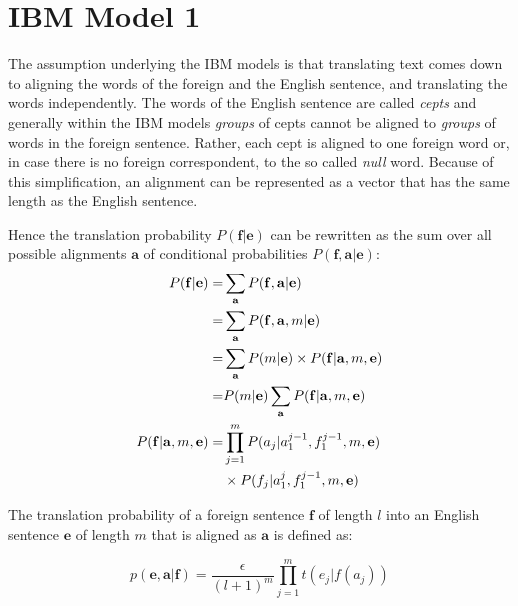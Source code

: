 \documentclass[11pt]{article}
\renewcommand{\vec}[1]{\mathbf{#1}}
\begin{document}
\section{IBM Model 1}
\label{IBM1}

The assumption underlying the IBM models is that translating text comes down to aligning the words 
of the foreign and the English sentence, and translating the words independently.
The words of the English sentence are called \textit{cepts} and generally within the IBM models \emph{groups} of cepts cannot be aligned to \emph{groups} of words in the foreign sentence.  Rather, each cept  is aligned to one foreign word or, in case there is no foreign correspondent, to the so called \textit{null} word.
Because of this simplification, an alignment can be represented as a vector that has the same length as the English sentence.

Hence the translation probability $P(\vec{f}|\vec{e})$ can be rewritten as the sum over all possible alignments $\vec{a}$ of conditional probabilities $P(\vec{f}, \vec{a}|\vec{e})$:
\begin{align}
P(\vec{f}|\vec{e}) =& \sum_\vec{a} P(\vec{f},\vec{a}|\vec{e})\\
=&\sum_\vec{a}  P(\vec{f},\vec{a},m|\vec{e}) \\
=&\sum_\vec{a}  P(m|\vec{e})\times P(\vec{f}|\vec{a},m,\vec{e})\\
=&  P(m|\vec{e}) \sum_\vec{a} P(\vec{f}|\vec{a},m,\vec{e})\\
P(\vec{f}|\vec{a},m,\vec{e})=&\prod_{j=1}^{m} P(a_j|a_1^{j-1}, f_1^{j-1}, m, \vec{e}) \notag \\
& \times  P(f_j|a_1^j,f_1^{j-1},m,\vec{e})
\end{align}



The translation probability of a foreign sentence $\vec{f}$ of length $l$ into an English sentence $\vec{e}$ of length $m$ that is aligned as $\vec{a}$ is defined as:

\begin{equation}
p(\vec{e},\vec{a}|\vec{f}) = \frac{\epsilon}{(l + 1)^m} \prod_{j=1}^{m}t(e_j|f(a_j))
\end{equation}
\end{document}
